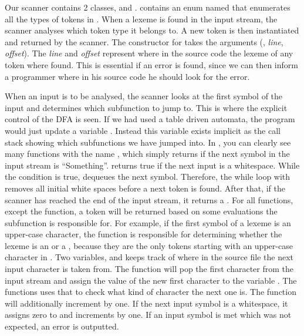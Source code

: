 Our scanner contains 2 classes,  and .  contains an enum named  that enumerates all the types of tokens in \productname{}. When a lexeme is found in the input stream, the scanner analyses which token type it belongs to. A new token is then instantiated and returned by the scanner. The constructor for  takes the arguments (, \textit{line}, \textit{offset}). The \textit{line} and \textit{offset} represent where in the source code the lexeme of any token where found. This is essential if an error is found, since we can then inform a programmer where in his source code he should look for the error.
 
When an input is to be analysed, the scanner looks at the first symbol of the input and determines which subfunction to jump to. 
This is where the explicit control of the DFA is seen. If we had used a table driven automata, the program would just update a variable . 
Instead this variable exists implicit as the call stack showing which subfunctions we have jumped into. In , you can clearly see many functions with the name , which simply returns if the next symbol in the input stream is ``Something''.  returns true if the next input is a whitespace.
While the condition is true,  dequeues the next symbol. Therefore, the while loop with  removes all initial white spaces before a next token is found. After that, if the scanner has reached the end of the input stream, it returns a . 
For all  functions, except the  function, a token will be returned based on some evaluations the subfunction is responsible for.
For example, if the first symbol of a lexeme is an upper-case character, the function  is responsible for determining whether the lexeme is an  or a , because they are the only tokens starting with an upper-case character in \productname{}. Two variables,   and   keeps track of where in the source file the next input character is taken from. The function  will pop the first character from the input stream and assign the value of the new first character to the variable . The  functions uses that  to check what kind of character the next one is.
The  function will additionally increment  by one. If the next input symbol is a whitespace, it assigns zero to   and increments  by one. If an input symbol is met which was not expected, an error is outputted.
 

